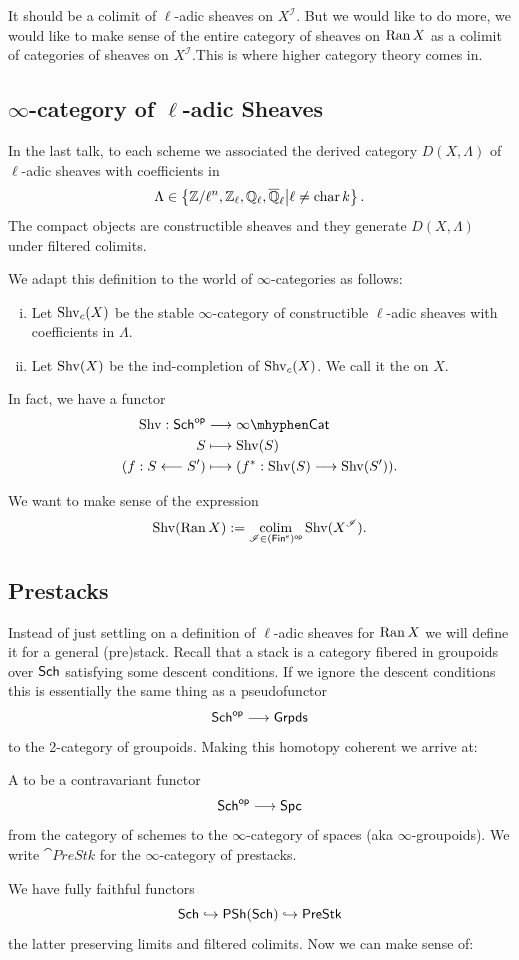\documentclass[oneside]{amsart}
\newcommand{\CI}{\mathcal{I}}
\DeclareMathOperator{\car}{char}
\newcommand{\Spc}{\cat{Spc}}
\newcommand{\PreStk}{\cat{PreStk}}
\begin{document}
It should be a colimit of $\ell$-adic sheaves on $X^{\CI}$. But we would like to do more, we would like to make sense of the entire category of sheaves on $\operatorname{Ran} X$ as a colimit of categories of sheaves on $X^{\CI}$.This is where higher category theory comes in.

\subsection{\texorpdfstring{$\infty$-category of $\ell$-adic Sheaves}{Infinity-category of l-adic Sheaves}}
In the last talk, to each scheme we associated the derived category $D(X,\Lambda)$ of $\ell$-adic sheaves with coefficients in
\[
\Lambda\in \left\{ \Z /\ell^{n}, \Z_\ell, \Q_\ell, \overline{\Q}_\ell \middle| \ell\neq \car k \right\} .
\] 
The compact objects are constructible sheaves and they generate $D(X,\Lambda)$ under filtered colimits.

We adapt this definition to the world of $\infty$-categories as follows:
\begin{enumerate}[(i)]
	\item Let $\operatorname{Shv}_c(X)$ be the stable $\infty$-category of constructible $\ell$-adic sheaves with coefficients in $\Lambda$.
	\item Let $\operatorname{Shv}(X)$ be the ind-completion of $\operatorname{Shv}_c(X)$. We call it the  on $X$.
\end{enumerate}

In fact, we have a functor
\begin{align*}
	\Shv:\Sch\op &\longrightarrow \iCat \\
	S &\longmapsto \Shv(S) \\
	(f:S\from S') &\longmapsto (f^{*}:\Shv(S)\to \Shv(S')).
\end{align*}

We want to make sense of the expression
\[
\Shv(\Ran X) \defeq \colim_{\CI\in (\Fins)\op}\Shv(X^{\CI}).
\] 

\subsection{Prestacks}
Instead of just settling on a definition of $\ell$-adic sheaves for $\operatorname{Ran} X$ we will define it for a general (pre)stack. Recall that a stack is a category fibered in groupoids over $\mathsf{Sch}$ satisfying some descent conditions. If we ignore the descent conditions this is essentially the same thing as a pseudofunctor
\[
	\Sch\op \to \cat{Grpds}
\] 
to the 2-category of groupoids. Making this homotopy coherent we arrive at:
\begin{definition}
	A  to be a contravariant functor
	\[
	\Sch\op\to \Spc
	\] 
	from the category of schemes to the $\infty$-category of spaces (aka $\infty$-groupoids). We write $\PreStk$ for the $\infty$-category of prestacks.
\end{definition}
We have fully faithful functors
\[
\Sch \injto \PSh(\Sch) \injto \PreStk
\] 
the latter preserving limits and filtered colimits. Now we can make sense of:
\end{document}
